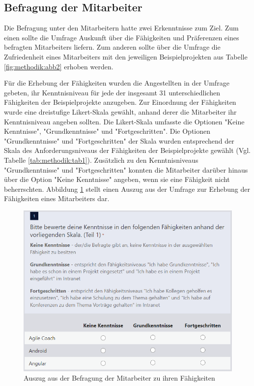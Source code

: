\subsection{Befragung der Mitarbeiter}
\label{ch:methodik:datenerhebung:1}
Die Befragung unter den Mitarbeitern hatte zwei Erkenntnisse zum Ziel.
Zum einen sollte die Umfrage Auskunft über die Fähigkeiten und Präferenzen eines befragten Mitarbeiters liefern.
Zum anderen sollte über die Umfrage die Zufriedenheit eines Mitarbeiters mit den jeweiligen Beispielprojekten aus Tabelle \ref{fig:methodik:abb2} erhoben werden.

Für die Erhebung der Fähigkeiten wurden die Angestellten in der Umfrage gebeten, ihr Kenntnisniveau für jede der insgesamt 31 unterschiedlichen Fähigkeiten der Beispielprojekte anzugeben.
Zur Einordnung der Fähigkeiten wurde eine dreistufige Likert-Skala gewählt, anhand derer die Mitarbeiter ihr Kenntnisniveau angeben sollten.
Die Likert-Skala umfasste die Optionen "Keine Kenntnisse", "Grundkenntnisse" und "Fortgeschritten".
Die Optionen "Grundkenntnisse" und "Fortgeschritten" der Skala wurden entsprechend der Skala des Anforderungsniveaus der Fähigkeiten der Beispielprojekte gewählt (Vgl. Tabelle \ref{tab:methodik:tab1}).
Zusätzlich zu den Kenntnisniveaus "Grundkenntnisse" und "Fortgeschritten" konnten die Mitarbeiter darüber hinaus über die Option "Keine Kenntnisse" angeben, wenn sie eine Fähigkeit nicht beherrschten.
Abbildung \ref{fig:methodik:abb3} stellt einen Auszug aus der Umfrage zur Erhebung der Fähigkeiten eines Mitarbeiters dar.

\begin{figure}[H]
    \centering
	\includegraphics[width=1\textwidth]{gfx/befragung-faehigkeiten.png}
	\caption[Auszug aus der Befragung der Mitarbeiter zu ihren Fähigkeiten]{Auszug aus der Befragung der Mitarbeiter zu ihren Fähigkeiten}
	\label{fig:methodik:abb3}
\end{figure}


